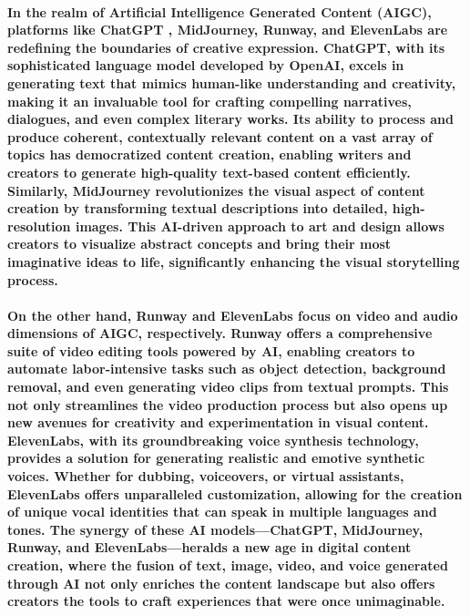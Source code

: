 \documentclass[11pt,a4paper,oneside]{report}
\begin{document}
\paragraph{In the realm of Artificial Intelligence Generated Content (AIGC), platforms like ChatGPT \cite{leiter2023chatgpt} \cite{openai2023gpt}, MidJourney, Runway, and ElevenLabs are redefining the boundaries of creative expression. ChatGPT, with its sophisticated language model developed by OpenAI, excels in generating text that mimics human-like understanding and creativity, making it an invaluable tool for crafting compelling narratives, dialogues, and even complex literary works. Its ability to process and produce coherent, contextually relevant content on a vast array of topics has democratized content creation, enabling writers and creators to generate high-quality text-based content efficiently. Similarly, MidJourney revolutionizes the visual aspect of content creation by transforming textual descriptions into detailed, high-resolution images. This AI-driven approach to art and design allows creators to visualize abstract concepts and bring their most imaginative ideas to life, significantly enhancing the visual storytelling process.}

\paragraph{On the other hand, Runway and ElevenLabs focus on video and audio dimensions of AIGC, respectively. Runway offers a comprehensive suite of video editing tools powered by AI, enabling creators to automate labor-intensive tasks such as object detection, background removal, and even generating video clips from textual prompts. This not only streamlines the video production process but also opens up new avenues for creativity and experimentation in visual content. ElevenLabs, with its groundbreaking voice synthesis technology, provides a solution for generating realistic and emotive synthetic voices. Whether for dubbing, voiceovers, or virtual assistants, ElevenLabs offers unparalleled customization, allowing for the creation of unique vocal identities that can speak in multiple languages and tones. The synergy of these AI models—ChatGPT, MidJourney, Runway, and ElevenLabs—heralds a new age in digital content creation, where the fusion of text, image, video, and voice generated through AI not only enriches the content landscape but also offers creators the tools to craft experiences that were once unimaginable.}
\end{document}
